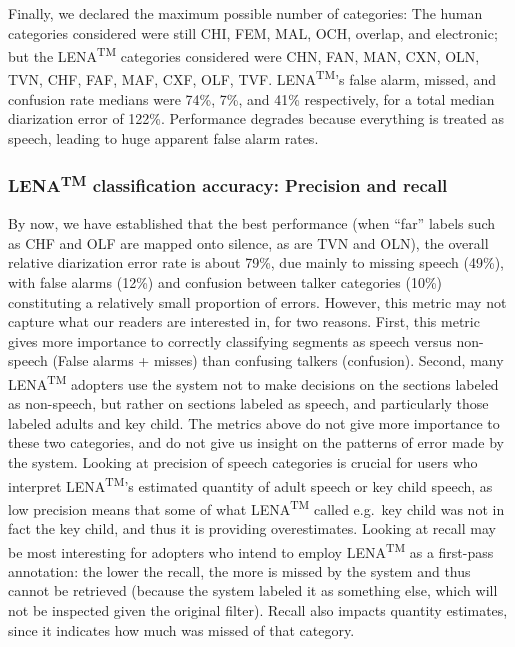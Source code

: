 \documentclass[english,floatsintext,man]{apa6}
\begin{document}
Finally, we declared the maximum possible number of categories: The
human categories considered were still CHI, FEM, MAL, OCH, overlap, and
electronic; but the LENA\textsuperscript{TM} categories considered were
CHN, FAN, MAN, CXN, OLN, TVN, CHF, FAF, MAF, CXF, OLF, TVF.
LENA\textsuperscript{TM}'s false alarm, missed, and confusion rate
medians were 74\%, 7\%, and 41\% respectively, for a total median
diarization error of 122\%. Performance degrades because everything is
treated as speech, leading to huge apparent false alarm rates.

\subsubsection{\texorpdfstring{LENA\textsuperscript{TM} classification
accuracy: Precision and
recall}{LENATM classification accuracy: Precision and recall}}\label{lenatm-classification-accuracy-precision-and-recall}

By now, we have established that the best performance (when
\enquote{far} labels such as CHF and OLF are mapped onto silence, as are
TVN and OLN), the overall relative diarization error rate is about 79\%,
due mainly to missing speech (49\%), with false alarms (12\%) and
confusion between talker categories (10\%) constituting a relatively
small proportion of errors. However, this metric may not capture what
our readers are interested in, for two reasons. First, this metric gives
more importance to correctly classifying segments as speech versus
non-speech (False alarms + misses) than confusing talkers (confusion).
Second, many LENA\textsuperscript{TM} adopters use the system not to
make decisions on the sections labeled as non-speech, but rather on
sections labeled as speech, and particularly those labeled adults and
key child. The metrics above do not give more importance to these two
categories, and do not give us insight on the patterns of error made by
the system. Looking at precision of speech categories is crucial for
users who interpret LENA\textsuperscript{TM}'s estimated quantity of
adult speech or key child speech, as low precision means that some of
what LENA\textsuperscript{TM} called e.g.~key child was not in fact the
key child, and thus it is providing overestimates. Looking at recall may
be most interesting for adopters who intend to employ
LENA\textsuperscript{TM} as a first-pass annotation: the lower the
recall, the more is missed by the system and thus cannot be retrieved
(because the system labeled it as something else, which will not be
inspected given the original filter). Recall also impacts quantity
estimates, since it indicates how much was missed of that category.
\end{document}

